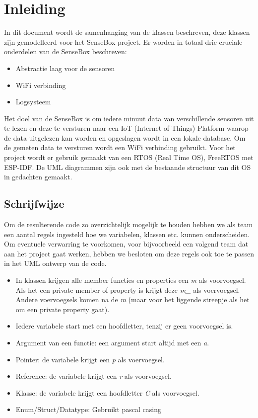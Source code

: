 \section{Inleiding}
In dit document wordt de samenhanging van de klassen beschreven, deze klassen zijn gemodelleerd voor het SenseBox project. Er worden in totaal drie cruciale onderdelen van de SenseBox beschreven:

\begin{itemize}
  \item Abstractie laag voor de sensoren
  \item WiFi verbinding
  \item Logsysteem
\end{itemize}

Het doel van de SenseBox is om iedere minuut data van verschillende sensoren uit te lezen en deze te versturen naar een IoT (Internet of Things) Platform waarop de data uitgelezen kan worden en opgeslagen wordt in een lokale database. Om de gemeten data te versturen wordt een WiFi verbinding gebruikt.
\vspace{1em}
Voor het project wordt er gebruik gemaakt van een RTOS (Real Time OS), FreeRTOS met ESP-IDF. De UML diagrammen zijn ook met de bestaande structuur van dit OS in gedachten gemaakt.

\subsection{Schrijfwijze}
Om de resulterende code zo overzichtelijk mogelijk te houden hebben we als team een aantal regels ingesteld hoe we variabelen, klassen etc. kunnen onderscheiden. Om eventuele verwarring te voorkomen, voor bijvoorbeeld een volgend team dat aan het project gaat werken, hebben we besloten om deze regels ook toe te passen in het UML ontwerp van de code.
\vspace{1em}
\begin{itemize}
  \item In klassen krijgen alle member functies en properties een \textit{m} als voorvoegsel. Als het een private member of property is krijgt deze \textit{m\_} als voervoegsel. Andere voervoegsels komen na de \textit{m} (maar voor het liggende streepje als het om een private property gaat).
  \item Iedere variabele start met een hoofdletter, tenzij er geen voorvoegsel is.
  \item Argument van een functie: een argument start altijd met een \textit{a}.
  \item Pointer: de variabele krijgt een \textit{p} als voervoegsel.
  \item Reference: de variabele krijgt een \textit{r} als voorvoegsel.
  \item Klasse: de variabele krijgt een hoofdletter \textit{C} als voorvoegsel.
  \item Enum/Struct/Datatype: Gebruikt pascal casing
\end{itemize}